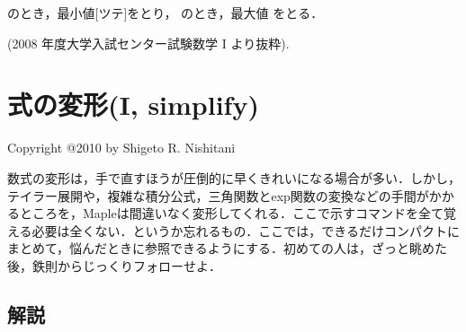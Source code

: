 \documentclass{article}
\begin{document}
\begin{maplegroup}
\begin{center}
\begin{Maple Normal}{
のとき，最小値[ツテ]をとり，
のとき，最大値
をとる．}\end{Maple Normal}
\end{center}
\begin{Maple Normal}{
(2008 年度大学入試センター試験数学 I より抜粋).}\end{Maple Normal}
\end{maplegroup}
\begin{maplegroup}
\newpage
\end{maplegroup}
\section{\textbf{式の変形(I, simplify)}}
\begin{maplelatex}\begin{flushright}
\begin{Maple Normal}{
Copyright @2010 by Shigeto R. Nishitani}\end{Maple Normal}
\end{flushright}
\end{maplelatex}
\begin{maplelatex}\begin{flushright}
\begin{Maple Normal}{
}\end{Maple Normal}
\end{flushright}
\end{maplelatex}
\begin{maplelatex}\begin{Maple Normal}{
数式の変形は，手で直すほうが圧倒的に早くきれいになる場合が多い．しかし，テイラー展開や，複雑な積分公式，三角関数とexp関数の変換などの手間がかかるところを，Mapleは間違いなく変形してくれる．ここで示すコマンドを全て覚える必要は全くない．というか忘れるもの．ここでは，できるだけコンパクトにまとめて，悩んだときに参照できるようにする．初めての人は，ざっと眺めた後，鉄則からじっくりフォローせよ．}\end{Maple Normal}
\end{maplelatex}
\subsection{\textbf{解説}}
\end{document}
